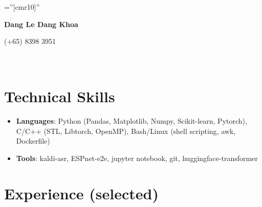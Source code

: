\documentclass[10pt]{article}
\newcommand{\blackhref}[3][black]{\href{#2}{\color{#1}{#3}}}%
\begin{document}
    \pagestyle{empty}       %
    \font\fb=''[cmr10]''    %

    \begin{multicols}{2}
        \begin{flushleft}
            \textbf{{\Huge Dang Le Dang Khoa }}
        \end{flushleft}

        \columnbreak

        \begin{flushright}
            \normalsize (+65) 8398 3951 \faPhoneSquare \\
            \blackhref{mailto:dangledangkhoa@gmail.com}{dangledangkhoa@gmail.com} \faEnvelopeSquare \\
            \blackhref{https://github.com/dangkhoadl}{github.com/dangkhoadl} \faGithub \\
            \blackhref{https://sg.linkedin.com/in/dangledangkhoa}{linkedin.com/in/dangledangkhoa} \faLinkedinSquare
        \end{flushright}
    \end{multicols}

    \vspace{-8mm}
    \section{Technical Skills}
    \begin{itemize}[noitemsep,leftmargin=*]
        \item \textbf{Languages}: Python (Pandas, Matplotlib, Numpy, Scikit-learn, Pytorch), C/C++ (STL, Libtorch, OpenMP), Bash/Linux (shell scripting, awk, Dockerfile)
        \item \textbf{Tools}: kaldi-asr, ESPnet-e2e, jupyter notebook, git, huggingface-transformer
    \end{itemize}

    \vspace{2mm}
    \section{Experience (selected)}
        \vspace{-2mm}
\end{document}
